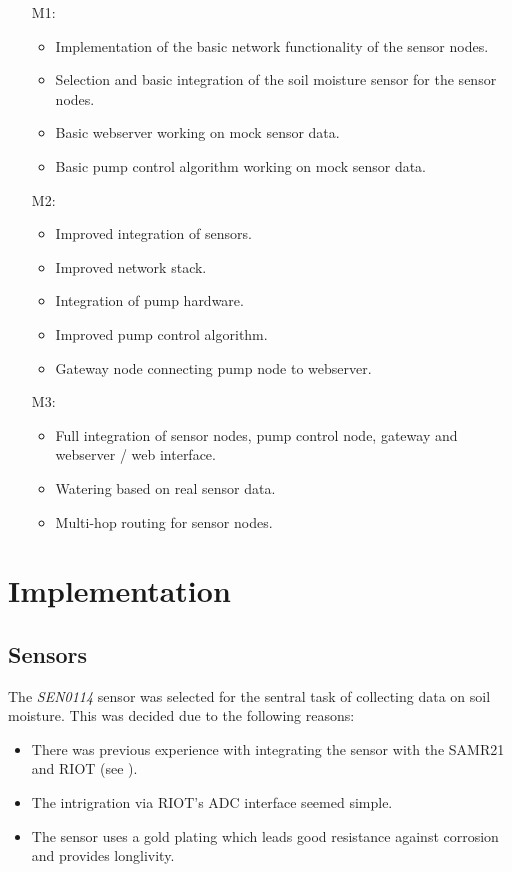 \documentclass[11pt,paper=a4,parskip=half]{scrartcl}
\begin{document}
  \begin{itemize}
    \item[M1:]
      \begin{itemize}
	\item Implementation of the basic network functionality of the sensor
		nodes.
	\item Selection and basic integration of the soil moisture sensor for
		the sensor nodes.
	\item Basic webserver working on mock sensor data.
	\item Basic pump control algorithm working on mock sensor data.
      \end{itemize}
    \item[M2:]
      \begin{itemize}
	\item Improved integration of sensors.
	\item Improved network stack.
	\item Integration of pump hardware.
	\item Improved pump control algorithm.
	\item Gateway node connecting pump node to webserver.
      \end{itemize}
    \item[M3:]
      \begin{itemize}
	\item Full integration of sensor nodes, pump control node, gateway and
		webserver / web interface.
	\item Watering based on real sensor data.
	\item Multi-hop routing for sensor nodes.
      \end{itemize}
  \end{itemize}


\section{Implementation}

\subsection{Sensors}
\label{sec:sensors}
  The \textit{SEN0114} \cite{SEN} sensor was selected for the sentral task of collecting
  data on soil moisture. This was decided due to the following reasons:

  \begin{itemize}
    \item There was previous experience with integrating the sensor with the
	    SAMR21 and RIOT (see \cite{watrli}).
    \item The intrigration via RIOT's ADC interface \cite{riot_adc} seemed
	    simple.
    \item The sensor uses a gold plating which leads good resistance against
	    corrosion and provides longlivity.
  \end{itemize}
\end{document}
